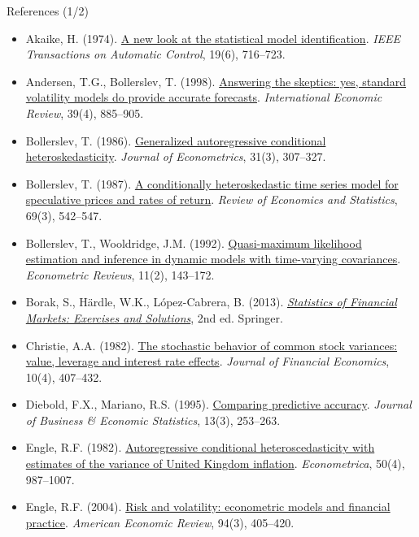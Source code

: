 \begin{frame}{References (1/2)}
\itemsize{\tiny}
\begin{itemize}
    \item Akaike, H. (1974). \href{https://doi.org/10.1109/TAC.1974.1100705}{A new look at the statistical model identification}. \textit{IEEE Transactions on Automatic Control}, 19(6), 716--723.
    \item Andersen, T.G., Bollerslev, T. (1998). \href{https://doi.org/10.2307/2527343}{Answering the skeptics: yes, standard volatility models do provide accurate forecasts}. \textit{International Economic Review}, 39(4), 885--905.
    \item Bollerslev, T. (1986). \href{https://doi.org/10.1016/0304-4076(86)90063-1}{Generalized autoregressive conditional heteroskedasticity}. \textit{Journal of Econometrics}, 31(3), 307--327.
    \item Bollerslev, T. (1987). \href{https://doi.org/10.2307/1925546}{A conditionally heteroskedastic time series model for speculative prices and rates of return}. \textit{Review of Economics and Statistics}, 69(3), 542--547.
    \item Bollerslev, T., Wooldridge, J.M. (1992). \href{https://doi.org/10.1080/07474939208800229}{Quasi-maximum likelihood estimation and inference in dynamic models with time-varying covariances}. \textit{Econometric Reviews}, 11(2), 143--172.
    \item Borak, S., Härdle, W.K., López-Cabrera, B. (2013). \href{https://doi.org/10.1007/978-3-642-33929-5}{\textit{Statistics of Financial Markets: Exercises and Solutions}}, 2nd ed. Springer.
    \item Christie, A.A. (1982). \href{https://doi.org/10.1016/0304-405X(82)90018-6}{The stochastic behavior of common stock variances: value, leverage and interest rate effects}. \textit{Journal of Financial Economics}, 10(4), 407--432.
    \item Diebold, F.X., Mariano, R.S. (1995). \href{https://doi.org/10.1080/07350015.1995.10524599}{Comparing predictive accuracy}. \textit{Journal of Business \& Economic Statistics}, 13(3), 253--263.
    \item Engle, R.F. (1982). \href{https://doi.org/10.2307/1912773}{Autoregressive conditional heteroscedasticity with estimates of the variance of United Kingdom inflation}. \textit{Econometrica}, 50(4), 987--1007.
    \item Engle, R.F. (2004). \href{https://doi.org/10.1257/0002828041464597}{Risk and volatility: econometric models and financial practice}. \textit{American Economic Review}, 94(3), 405--420.

\end{itemize}
\end{frame}
